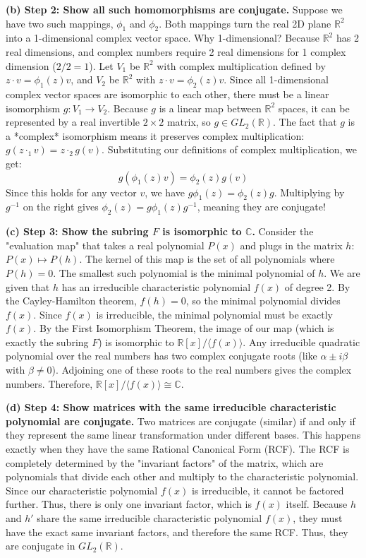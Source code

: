 \begin{solution}
\textbf{(b) Step 2: Show all such homomorphisms are conjugate.}
Suppose we have two such mappings, $\phi_1$ and $\phi_2$. Both mappings turn the real 2D plane $\mathbb{R}^2$ into a 1-dimensional complex vector space. Why 1-dimensional? Because $\mathbb{R}^2$ has 2 real dimensions, and complex numbers require 2 real dimensions for 1 complex dimension ($2/2 = 1$).
Let $V_1$ be $\mathbb{R}^2$ with complex multiplication defined by $z \cdot v = \phi_1(z)v$, and $V_2$ be $\mathbb{R}^2$ with $z \cdot v = \phi_2(z)v$.
Since all 1-dimensional complex vector spaces are isomorphic to each other, there must be a linear isomorphism $g: V_1 \to V_2$.
Because $g$ is a linear map between $\mathbb{R}^2$ spaces, it can be represented by a real invertible $2 \times 2$ matrix, so $g \in GL_2(\mathbb{R})$.
The fact that $g$ is a *complex* isomorphism means it preserves complex multiplication: $g(z \cdot_{1} v) = z \cdot_{2} g(v)$.
Substituting our definitions of complex multiplication, we get:
\[ g(\phi_1(z)v) = \phi_2(z)g(v) \]
Since this holds for any vector $v$, we have $g \phi_1(z) = \phi_2(z) g$. Multiplying by $g^{-1}$ on the right gives $\phi_2(z) = g \phi_1(z) g^{-1}$, meaning they are conjugate!

\textbf{(c) Step 3: Show the subring $F$ is isomorphic to $\mathbb{C}$.}
Consider the "evaluation map" that takes a real polynomial $P(x)$ and plugs in the matrix $h$: $P(x) \mapsto P(h)$. 
The kernel of this map is the set of all polynomials where $P(h) = 0$. The smallest such polynomial is the minimal polynomial of $h$.
We are given that $h$ has an irreducible characteristic polynomial $f(x)$ of degree 2. By the Cayley-Hamilton theorem, $f(h) = 0$, so the minimal polynomial divides $f(x)$. Since $f(x)$ is irreducible, the minimal polynomial must be exactly $f(x)$.
By the First Isomorphism Theorem, the image of our map (which is exactly the subring $F$) is isomorphic to $\mathbb{R}[x] / \langle f(x) \rangle$.
Any irreducible quadratic polynomial over the real numbers has two complex conjugate roots (like $\alpha \pm i\beta$ with $\beta \neq 0$). Adjoining one of these roots to the real numbers gives the complex numbers. Therefore, $\mathbb{R}[x] / \langle f(x) \rangle \cong \mathbb{C}$.

\textbf{(d) Step 4: Show matrices with the same irreducible characteristic polynomial are conjugate.}
Two matrices are conjugate (similar) if and only if they represent the same linear transformation under different bases. This happens exactly when they have the same Rational Canonical Form (RCF).
The RCF is completely determined by the "invariant factors" of the matrix, which are polynomials that divide each other and multiply to the characteristic polynomial.
Since our characteristic polynomial $f(x)$ is irreducible, it cannot be factored further. Thus, there is only one invariant factor, which is $f(x)$ itself.
Because $h$ and $h'$ share the same irreducible characteristic polynomial $f(x)$, they must have the exact same invariant factors, and therefore the same RCF. Thus, they are conjugate in $GL_2(\mathbb{R})$.


\end{solution}
